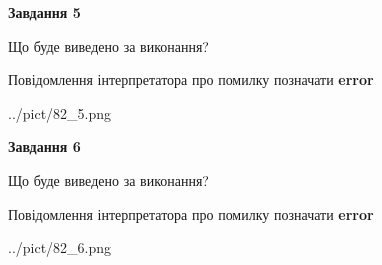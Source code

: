 \documentclass[12pt, ukrainian]{article}
\begin{document}
{{\begin {center}\textbf{Завдання 5}\end {center}}\par
Що буде виведено за виконання? \par
Повідомлення інтерпретатора про помилку позначати \textbf{error}

\begin{center}
	{../pict/82_5.png}
\end{center}
\newpage

{\begin {center}\textbf{Завдання 6}\end {center}}\par
Що буде виведено за виконання? \par
Повідомлення інтерпретатора про помилку позначати \textbf{error}

\begin{center}
	{../pict/82_6.png}
\end{center}
\newpage

}
\end{document}
